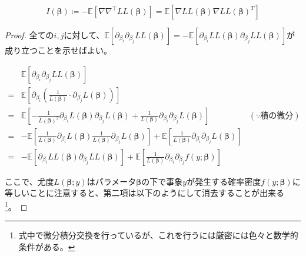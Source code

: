 \begin{lemma}
    \label{lm:fisher_prod}
    \begin{equation}
        I(\bm\beta) \coloneqq -\mathbb{E}\left[\nabla\nabla^\top LL(\bm\beta)\right] = \mathbb{E}[\nabla LL(\bm{\beta})\nabla LL(\bm{\beta})^T]
    \end{equation}
\end{lemma}
\begin{proof}
    全ての$i,j$に対して、$\mathbb{E}\left[\partial_{\beta_i}\partial_{\beta_j} LL(\bm{\beta})\right] = -\mathbb{E}\left[\partial_{\beta_i}LL(\bm{\beta}) \partial_{\beta_j} LL(\bm{\beta})\right]$が成り立つことを示せばよい。
    
    \begin{equation}
        \begin{aligned}
              & \mathbb{E}\left[\partial_{\beta_i}\partial_{\beta_j} LL(\bm{\beta})\right]                                                                                                                                                                                   \\
            = & \mathbb{E}\left[\partial_{\beta_i}\left(\frac{1}{L(\bm{\beta})}\cdot \partial_{\beta_j} L(\bm{\beta})\right)\right]                                                                                                                                          \\
            = & \mathbb{E}\left[-\frac{1}{L(\bm{\beta})^2}\partial_{\beta_i} L(\bm{\beta})\partial_{\beta_j} L(\bm{\beta}) + \frac{1}{L(\bm{\beta})}\partial_{\beta_i}\partial_{\beta_j} L(\bm{\beta})\right]                                              & (\because 積の微分) \\
            = & -\mathbb{E}\left[\frac{1}{L(\bm{\beta})}\partial_{\beta_i} L(\bm{\beta}) \frac{1}{L(\bm{\beta})}\partial_{\beta_j} L(\bm{\beta})\right] + \mathbb{E}\left[\frac{1}{L(\bm{\beta})}\partial_{\beta_i}\partial_{\beta_j} L(\bm{\beta})\right]                   \\
            = & -\mathbb{E}\left[\partial_{\beta_i} LL(\bm{\beta}) \partial_{\beta_j} LL(\bm{\beta})\right] + \mathbb{E}\left[\frac{1}{L(\bm{\beta})}\partial_{\beta_i}\partial_{\beta_j} f(y;\bm{\beta})\right]
        \end{aligned}
    \end{equation}
    
    ここで、尤度$L(\bm{\beta};y)$はパラメータ$\bm\beta$の下で事象$y$が発生する確率密度$f(y;\bm{\beta})$に等しいことに注意すると、第二項は以下のようにして消去することが出来る\footnote{式中で微分積分交換を行っているが、これを行うには厳密には色々と数学的条件がある。}。
    

\end{proof}
